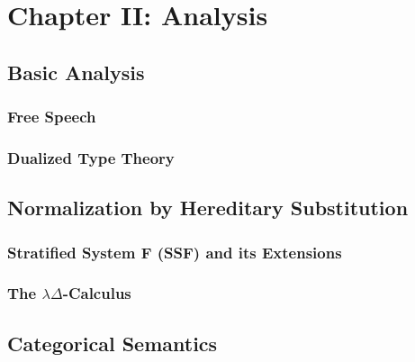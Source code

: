 
\section{Chapter II: Analysis}
\label{sec:analysis}

\subsection{Basic Analysis}
\label{subsec:basic_analysis}
\subsubsection{Free Speech}
\label{subsubsec:free_speech}


\subsubsection{Dualized Type Theory}
\label{subsubsec:dtt}


\subsection{Normalization by Hereditary Substitution}
\label{subsec:normalization_by_hereditary_substitution}
\subsubsection{Stratified System F (SSF) and its Extensions}
\label{subsec:stratified_system_f_ext}


\subsubsection{The $\lambda\Delta$-Calculus}
\label{subsec:the_lambdadelta-calculus}



\subsection{Categorical Semantics}
\label{subsec:categorical_semantics}
